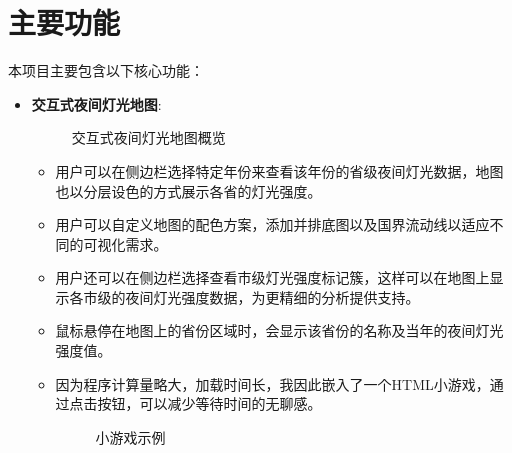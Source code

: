 \documentclass[14pt,a4paper,UTF8,twoside]{article}
\begin{document}
\section{主要功能}
本项目主要包含以下核心功能：
\begin{itemize}
    \item \textbf{交互式夜间灯光地图}:
    \begin{figure}[H]
        \centering
        \caption{交互式夜间灯光地图概览}
        \label{fig:interactive_map_example}
    \end{figure}
    \begin{itemize}
        \item 用户可以在侧边栏选择特定年份来查看该年份的省级夜间灯光数据，地图也以分层设色的方式展示各省的灯光强度。
        \item 用户可以自定义地图的配色方案，添加并排底图以及国界流动线以适应不同的可视化需求。
        \item 用户还可以在侧边栏选择查看市级灯光强度标记簇，这样可以在地图上显示各市级的夜间灯光强度数据，为更精细的分析提供支持。
        \item 鼠标悬停在地图上的省份区域时，会显示该省份的名称及当年的夜间灯光强度值。
        \item 因为程序计算量略大，加载时间长，我因此嵌入了一个HTML小游戏，通过点击按钮，可以减少等待时间的无聊感。
        \begin{figure}[H]
            \centering
            \caption{小游戏示例}
            \label{fig:game_example}
        \end{figure}
    \end{itemize}

\end{itemize}
\end{document}
